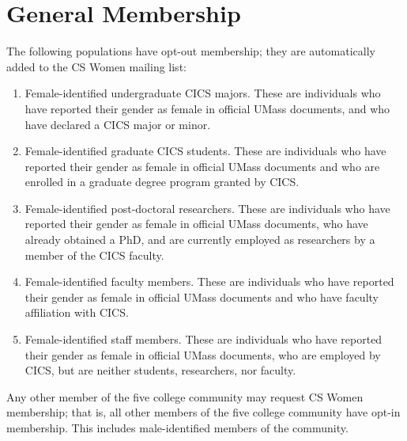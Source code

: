 \section{General Membership}
\label{sec:membership}
The following populations have opt-out membership; they are automatically added to the CS Women mailing list:
\begin{enumerate}
	\item Female-identified undergraduate CICS majors. These are individuals who have reported their gender as female in official UMass documents, and who have declared a CICS major or minor.
	\item Female-identified graduate CICS students. These are individuals who have reported their gender as female in official UMass documents and who are enrolled in a graduate degree program granted by CICS.
	\item Female-identified post-doctoral researchers. These are individuals who have reported their gender as female in official UMass documents, who have already obtained a PhD, and are currently employed as researchers by a member of the CICS faculty.
	\item Female-identified faculty members. These are individuals who have reported their gender as female in official UMass documents and who have faculty affiliation with CICS.
	\item Female-identified staff members. These are individuals who have reported their gender as female in official UMass documents, who are employed by CICS, but are neither students, researchers, nor faculty.
\end{enumerate}

Any other member of the five college community may request CS Women membership; that is, all other members of the five college community have opt-in membership. This includes male-identified members of the community. 